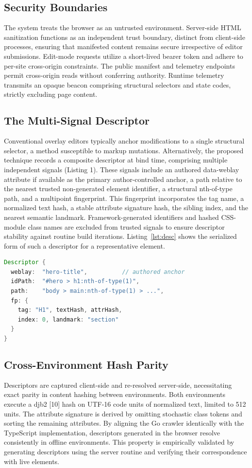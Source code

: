 \documentclass[conference]{IEEEtran}
\begin{document}
\subsection{Security Boundaries}
The system treats the browser as an untrusted environment. Server-side HTML sanitization functions as an independent trust boundary, distinct from client-side processes, ensuring that manifested content remains secure irrespective of editor submissions. Edit-mode requests utilize a short-lived bearer token and adhere to per-site cross-origin constraints. The public manifest and telemetry endpoints permit cross-origin reads without conferring authority. Runtime telemetry transmits an opaque beacon comprising structural selectors and state codes, strictly excluding page content.

\subsection{The Multi-Signal Descriptor}\label{sec:drift}
Conventional overlay editors typically anchor modifications to a single structural selector, a method susceptible to markup mutations. Alternatively, the proposed technique records a composite descriptor at bind time, comprising multiple independent signals (Listing 1). These signals include an authored data-weblay attribute if available as the primary author-controlled anchor, a path relative to the nearest trusted non-generated element identifier, a structural nth-of-type path, and a multipoint fingerprint. This fingerprint incorporates the tag name, a normalized text hash, a stable attribute signature hash, the sibling index, and the nearest semantic landmark. Framework-generated identifiers and hashed CSS-module class names are excluded from trusted signals to ensure descriptor stability against routine build iterations. Listing~\ref{lst:desc} shows the serialized form of such a descriptor for a representative element.

\begin{lstlisting}[caption={The multi-signal descriptor captured for every edit.},label={lst:desc},language=Java]
Descriptor {
  weblay:  "hero-title",          // authored anchor
  idPath:  "#hero > h1:nth-of-type(1)",
  path:    "body > main:nth-of-type(1) > ...",
  fp: {
    tag: "H1", textHash, attrHash,
    index: 0, landmark: "section"
  }
}
\end{lstlisting}

\subsection{Cross-Environment Hash Parity}
Descriptors are captured client-side and re-resolved server-side, necessitating exact parity in content hashing between environments. Both environments execute a djb2 [10] hash on UTF-16 code units of normalized text, limited to 512 units. The attribute signature is derived by omitting stochastic class tokens and sorting the remaining attributes. By aligning the Go crawler identically with the TypeScript implementation, descriptors generated in the browser resolve consistently in offline environments. This property is empirically validated by generating descriptors using the server routine and verifying their correspondence with live elements.
\end{document}
